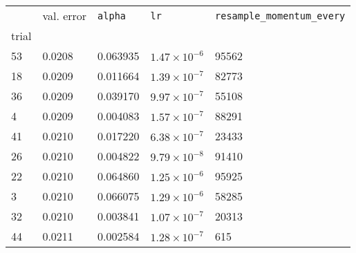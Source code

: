 \begin{tabular}{lp{2.3cm}p{2.3cm}p{2.3cm}p{2.3cm}}
\toprule
{} &  val. error &  \texttt{alpha} &         \texttt{lr} &  \texttt{resample\_momentum\_every} \\
trial &             &                 &                     &                                     \\
\midrule
53    &      0.0208 &        0.063935 & $1.47\times10^{-6}$ &                               95562 \\
18    &      0.0209 &        0.011664 & $1.39\times10^{-7}$ &                               82773 \\
36    &      0.0209 &        0.039170 & $9.97\times10^{-7}$ &                               55108 \\
4     &      0.0209 &        0.004083 & $1.57\times10^{-7}$ &                               88291 \\
41    &      0.0210 &        0.017220 & $6.38\times10^{-7}$ &                               23433 \\
26    &      0.0210 &        0.004822 & $9.79\times10^{-8}$ &                               91410 \\
22    &      0.0210 &        0.064860 & $1.25\times10^{-6}$ &                               95925 \\
3     &      0.0210 &        0.066075 & $1.29\times10^{-6}$ &                               58285 \\
32    &      0.0210 &        0.003841 & $1.07\times10^{-7}$ &                               20313 \\
44    &      0.0211 &        0.002584 & $1.28\times10^{-7}$ &                                 615 \\
\bottomrule
\end{tabular}
